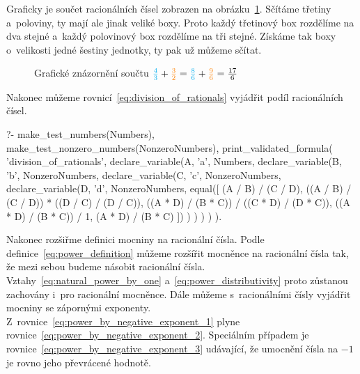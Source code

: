 Graficky je součet racionálních čísel zobrazen na obrázku~\ref{img:add_rational_numbers}. Sčítáme třetiny a~poloviny, ty mají ale jinak veliké boxy. Proto každý třetinový box rozdělíme na dva stejné a~každý polovinový box rozdělíme na tři stejné. Získáme tak boxy o~velikosti jedné šestiny jednotky, ty pak už můžeme sčítat.

\begin{figure}[!h]
\centering
{}
\caption{Grafické znázornění součtu \(\textcolor{cyan}{\frac{4}{3}} + \textcolor{orange}{\frac{3}{2}} = \textcolor{cyan}{\frac{8}{6}} + \textcolor{orange}{\frac{9}{6}} = \frac{17}{6}\)}
\label{img:add_rational_numbers}
\end{figure}

Nakonec můžeme rovnicí~\eqref{eq:division_of_rationals} vyjádřit podíl racionálních čísel.

\begin{prolog}
?-	make_test_numbers(Numbers),
	make_test_nonzero_numbers(NonzeroNumbers),
	print_validated_formula(
		'division_of_rationals',
		declare_variable(A, 'a', Numbers,
			declare_variable(B, 'b', NonzeroNumbers,
				declare_variable(C, 'c', NonzeroNumbers,
					declare_variable(D, 'd', NonzeroNumbers,
						equal([
							(A / B) / (C / D),
							((A / B) / (C / D)) * ((D / C) / (D / C)),
							((A * D) / (B * C)) / ((C * D) / (D * C)),
							((A * D) / (B * C)) / 1,
							(A * D) / (B * C)
						])
					)
				)
			)
		)
	).
\end{prolog}

Nakonec rozšiřme definici mocniny na racionální čísla. Podle definice~\eqref{eq:power_definition} můžeme rozšířit mocněnce na racionální čísla tak, že mezi sebou budeme násobit racionální čísla. Vztahy~\eqref{eq:natural_power_by_one} a~\eqref{eq:power_distributivity} proto zůstanou zachovány i~pro racionální mocněnce. 
Dále můžeme s~racionálními čísly vyjádřit mocniny se zápornými exponenty. Z~rovnice~\eqref{eq:power_by_negative_exponent_1} plyne rovnice~\eqref{eq:power_by_negative_exponent_2}. Speciálním případem je rovnice~\eqref{eq:power_by_negative_exponent_3} udávající, že umocnění čísla na \(-1\) je rovno jeho převrácené hodnotě.

